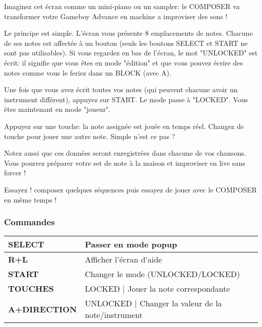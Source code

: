 Imaginez cet écran comme un mini-piano ou un sampler: le COMPOSER va transformer votre Gameboy Advance en machine a improviser des sons !


Le principe est simple.
L'écran vous présente 8 emplacements de notes.
Chacune de ses notes est affectée à un bouton (seuls les boutons SELECT et START ne sont pas utilisables).
Si vous regardez en bas de l'écran, le mot "UNLOCKED" est écrit:
    il signifie que vous êtes en mode "édition" et que vous pouvez écrire des notes comme vous le feriez dans un BLOCK (avec A).
\medskip

Une fois que vous avez écrit toutes vos notes (qui peuvent chacune avoir un instrument différent), appuyez sur START.
Le mode passe à "LOCKED". Vous êtes maintenant en mode "joueur".
\medskip

Appuyez sur une touche: la note assignée est jouée en temps réel.
Changez de touche pour jouer une autre note. Simple n'est ce pas ?
\medskip

Notez aussi que ces données seront enregistrées dans chacune de vos chansons.
Vous pourrez préparer votre set de note à la maison et improviser en live sans forcer !
\medskip

Essayez ! composez quelques séquences puis essayez de jouer avec le COMPOSER en même temps !
\medskip

\subsubsection{Commandes}

\tablelasttail{\hline}
\begin{supertabular}{|l|p{11cm}|}
    {\bf SELECT} & Passer en mode popup \\
    \hline
    {\bf R+L} & Afficher l'écran d'aide \\
    \hline
    {\bf START} & Changer le mode (UNLOCKED/LOCKED) \\
    \hline
    {\bf TOUCHES} & LOCKED | Jouer la note correspondante \\
    \hline
    {\bf A+DIRECTION} & UNLOCKED | Changer la valeur de la note/instrument \\
\end{supertabular}

